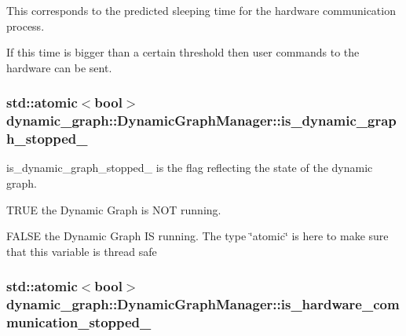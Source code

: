 This corresponds to the predicted sleeping time for the hardware communication process. 

If this time is bigger than a certain threshold then user commands to the hardware can be sent. 
\subsubsection[{\texorpdfstring{is\+\_\+dynamic\+\_\+graph\+\_\+stopped\+\_\+}{is_dynamic_graph_stopped_}}]{\setlength{\rightskip}{0pt plus 5cm}std\+::atomic$<$bool$>$ dynamic\+\_\+graph\+::\+Dynamic\+Graph\+Manager\+::is\+\_\+dynamic\+\_\+graph\+\_\+stopped\+\_\+\hspace{0.3cm}{\ttfamily [protected]}}\hypertarget{classdynamic__graph_1_1DynamicGraphManager_a87baafbaadf396a7663da653dc5da106}{}\label{classdynamic__graph_1_1DynamicGraphManager_a87baafbaadf396a7663da653dc5da106}


is\+\_\+dynamic\+\_\+graph\+\_\+stopped\+\_\+ is the flag reflecting the state of the dynamic graph. 


\begin{DoxyItemize}
\item T\+R\+UE the Dynamic Graph is N\+OT running.
\item F\+A\+L\+SE the Dynamic Graph IS running. The type \char`\"{}atomic\char`\"{} is here to make sure that this variable is thread safe 
\end{DoxyItemize}
\subsubsection[{\texorpdfstring{is\+\_\+hardware\+\_\+communication\+\_\+stopped\+\_\+}{is_hardware_communication_stopped_}}]{\setlength{\rightskip}{0pt plus 5cm}std\+::atomic$<$bool$>$ dynamic\+\_\+graph\+::\+Dynamic\+Graph\+Manager\+::is\+\_\+hardware\+\_\+communication\+\_\+stopped\+\_\+\hspace{0.3cm}{\ttfamily [protected]}}\hypertarget{classdynamic__graph_1_1DynamicGraphManager_ab1a2bc0a8f04126638056f430297097e}{}\label{classdynamic__graph_1_1DynamicGraphManager_ab1a2bc0a8f04126638056f430297097e}



